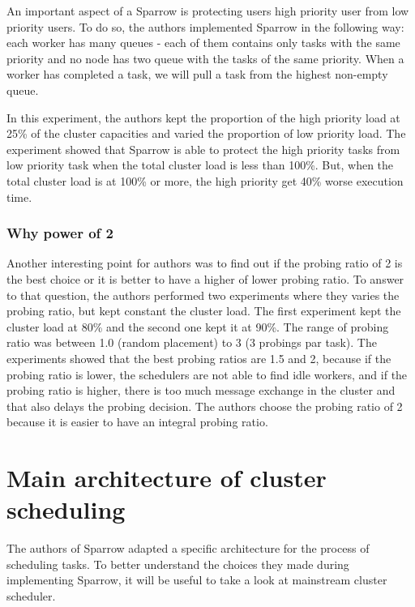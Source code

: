 \documentclass[11pt]{article}
\begin{document}
            An important aspect of a Sparrow is protecting users high priority user from low priority users. To do so, the authors implemented Sparrow in the following way: each worker has many queues - each of them contains only tasks with the same priority and no node has two queue with the tasks of the same priority. When a worker has completed a task, we will pull a task from the highest non-empty queue.
            
            In this experiment, the authors kept the proportion of the high priority load at 25\% of the cluster capacities and varied the proportion of low priority load. The experiment showed that Sparrow is able to protect the high priority tasks from low priority task when the total cluster load is less than 100\%. But, when the total cluster  load is at 100\% or more, the high priority get 40\% worse execution time.
        
        
        \subsubsection*{Why power of 2}
        
        	Another interesting point for authors was to find out if the probing ratio of 2 is the best choice or it is better to have a higher of lower probing ratio. To answer to that question, the authors performed two experiments where they varies the probing ratio, but kept constant the cluster load. The first experiment kept the cluster load at 80\% and the second one kept it at 90\%. The range of probing ratio was between 1.0 (random placement) to 3 (3 probings par task). The experiments showed that the best probing ratios are 1.5 and 2, because if the probing ratio is lower, the schedulers are not able to find idle workers, and if the probing ratio is higher, there is too much message exchange in the cluster and that also delays the probing decision. The authors choose the probing ratio of 2 because it is easier to have an integral probing ratio.


\section{Main architecture of cluster scheduling}

	The authors of Sparrow adapted a specific architecture for the process of scheduling tasks. To better understand the choices they made during implementing Sparrow, it will be useful to take a look at mainstream cluster scheduler.
    
\end{document}
